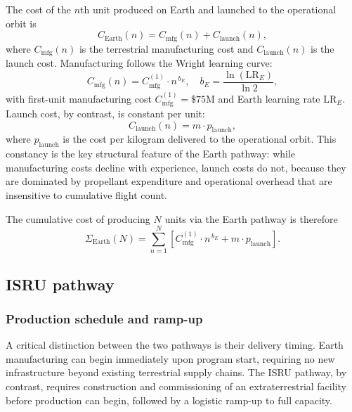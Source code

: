 \documentclass[preprint,12pt]{elsarticle}
\begin{document}
The cost of the $n$th unit produced on Earth and launched to the operational orbit is
\begin{equation}
  C_{\mathrm{Earth}}(n) = C_{\mathrm{mfg}}(n) + C_{\mathrm{launch}}(n),
  \label{eq:earth_unit}
\end{equation}
where $C_{\mathrm{mfg}}(n)$ is the terrestrial manufacturing cost and $C_{\mathrm{launch}}(n)$ is the launch cost. Manufacturing follows the Wright learning curve:
\begin{equation}
  C_{\mathrm{mfg}}(n) = C_{\mathrm{mfg}}^{(1)} \cdot n^{\,b_E}, \quad b_E = \frac{\ln(\mathrm{LR}_E)}{\ln 2},
  \label{eq:earth_mfg}
\end{equation}
with first-unit manufacturing cost $C_{\mathrm{mfg}}^{(1)} = \$75$M and Earth learning rate $\mathrm{LR}_E$. Launch cost, by contrast, is constant per unit:
\begin{equation}
  C_{\mathrm{launch}}(n) = m \cdot p_{\mathrm{launch}},
  \label{eq:earth_launch}
\end{equation}
where $p_{\mathrm{launch}}$ is the cost per kilogram delivered to the operational orbit. This constancy is the key structural feature of the Earth pathway: while manufacturing costs decline with experience, launch costs do not, because they are dominated by propellant expenditure and operational overhead that are insensitive to cumulative flight count.

The cumulative cost of producing $N$ units via the Earth pathway is therefore
\begin{equation}
  \Sigma_{\mathrm{Earth}}(N) = \sum_{n=1}^{N} \left[ C_{\mathrm{mfg}}^{(1)} \cdot n^{\,b_E} + m \cdot p_{\mathrm{launch}} \right].
  \label{eq:earth_cum}
\end{equation}

\subsection{ISRU pathway}

\subsubsection{Production schedule and ramp-up}

A critical distinction between the two pathways is their delivery timing. Earth manufacturing can begin immediately upon program start, requiring no new infrastructure beyond existing terrestrial supply chains. The ISRU pathway, by contrast, requires construction and commissioning of an extraterrestrial facility before production can begin, followed by a logistic ramp-up to full capacity.
\end{document}
